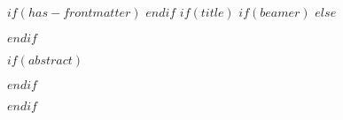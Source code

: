 $if(has-frontmatter)$
\frontmatter
$endif$
$if(title)$
$if(beamer)$
\frame{\titlepage}
$else$
\maketitle
$endif$

$if(abstract)$
\begin{abstract}
$abstract$

$if(keywords)$
$endif$

\end{abstract}
$endif$

$endif$